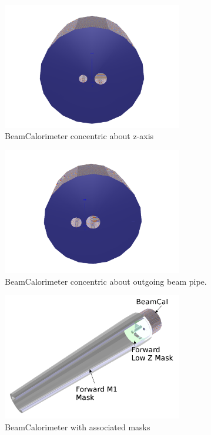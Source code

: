 \documentclass{report}
\begin{document}
            \begin{figure}[H] 
                \includegraphics[width=0.7\textwidth]{beamcal_zaxis}
                \centering
                \caption{BeamCalorimeter concentric about z-axis}
                \label{fig__beamcal_zaxis}
            \end{figure}
            \begin{figure}[H] 
                \includegraphics[width=0.7\textwidth]{beamcal_aligned}
                \centering
                \caption{BeamCalorimeter concentric about outgoing beam pipe.}
                \label{fig__beamcal_aligned}
            \end{figure}
            \begin{figure}[H] 
                \includegraphics[width=0.7\textwidth]{beamcal_masks}
                \centering
                \caption{BeamCalorimeter with associated masks}
                \label{fig__beamcal_masks}
            \end{figure}
\end{document}
